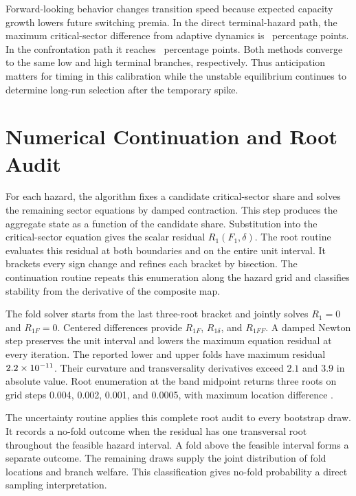 \documentclass[11pt]{article}
\theoremstyle{definition}
\begin{document}
Forward-looking behavior changes transition speed because expected capacity growth lowers future switching premia. In the direct terminal-hazard path, the maximum critical-sector difference from adaptive dynamics is \PFMaxCtrlPP\ percentage points. In the confrontation path it reaches \PFMaxSpikePP\ percentage points. Both methods converge to the same low and high terminal branches, respectively. Thus anticipation matters for timing in this calibration while the unstable equilibrium continues to determine long-run selection after the temporary spike.

\section{Numerical Continuation and Root Audit}\label{app:numerics}

For each hazard, the algorithm fixes a candidate critical-sector share and solves the remaining sector equations by damped contraction. This step produces the aggregate state as a function of the candidate share. Substitution into the critical-sector equation gives the scalar residual $R_1(F_1,\delta)$. The root routine evaluates this residual at both boundaries and on the entire unit interval. It brackets every sign change and refines each bracket by bisection. The continuation routine repeats this enumeration along the hazard grid and classifies stability from the derivative of the composite map.

The fold solver starts from the last three-root bracket and jointly solves $R_1=0$ and $R_{1F}=0$. Centered differences provide $R_{1F}$, $R_{1\delta}$, and $R_{1FF}$. A damped Newton step preserves the unit interval and lowers the maximum equation residual at every iteration. The reported lower and upper folds have maximum residual \(2.2\times10^{-11}\). Their curvature and transversality derivatives exceed $2.1$ and $3.9$ in absolute value. Root enumeration at the band midpoint returns three roots on grid steps 0.004, 0.002, 0.001, and 0.0005, with maximum location difference \RootGridDifference.

The uncertainty routine applies this complete root audit to every bootstrap draw. It records a no-fold outcome when the residual has one transversal root throughout the feasible hazard interval. A fold above the feasible interval forms a separate outcome. The remaining draws supply the joint distribution of fold locations and branch welfare. This classification gives no-fold probability a direct sampling interpretation.
\end{document}
